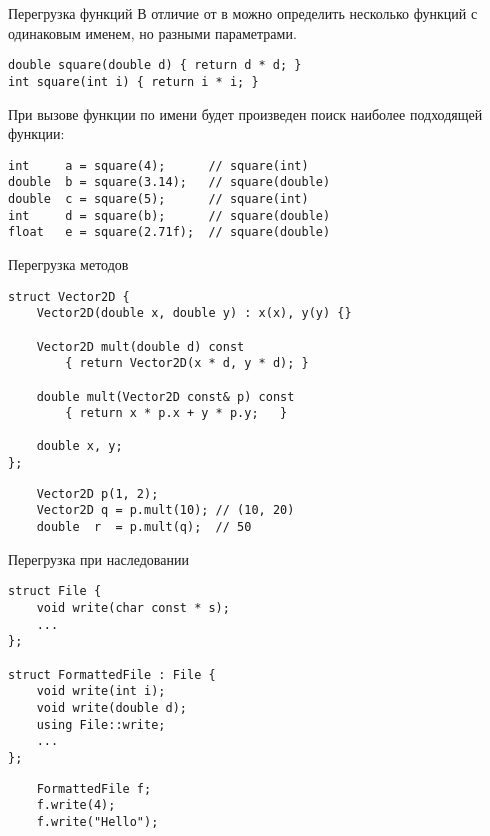 \documentclass{beamer}
\begin{document}
\begin{frame}[fragile]{Перегрузка функций}
    В отличие от \langc в \langcpp можно определить несколько функций
    с одинаковым именем, но разными параметрами.
    \begin{lstlisting}
double square(double d) { return d * d; }
int square(int i) { return i * i; }
    \end{lstlisting}
    При вызове функции по имени будет произведен поиск наиболее подходящей
    функции:
\begin{lstlisting}
int     a = square(4);      // square(int)
double  b = square(3.14);   // square(double)
double  c = square(5);      // square(int)
int     d = square(b);      // square(double)
float   e = square(2.71f);  // square(double)
\end{lstlisting}
\end{frame}
    
\begin{frame}[fragile]{Перегрузка методов}
    \begin{lstlisting}
struct Vector2D {
    Vector2D(double x, double y) : x(x), y(y) {}

    Vector2D mult(double d) const 
        { return Vector2D(x * d, y * d); }
    
    double mult(Vector2D const& p) const 
        { return x * p.x + y * p.y;   }

    double x, y;
};
\end{lstlisting}

\begin{lstlisting}
    Vector2D p(1, 2);
    Vector2D q = p.mult(10); // (10, 20)
    double  r  = p.mult(q);  // 50 
\end{lstlisting}

\end{frame}

\begin{frame}[fragile]{Перегрузка при наследовании}
    \begin{lstlisting}
struct File {
    void write(char const * s);
    ...
};

struct FormattedFile : File {
    void write(int i);
    void write(double d);
    using File::write;
    ...
};
    \end{lstlisting}

    \begin{lstlisting}
    FormattedFile f;
    f.write(4);
    f.write("Hello");
    \end{lstlisting}

\end{frame}
\end{document}
